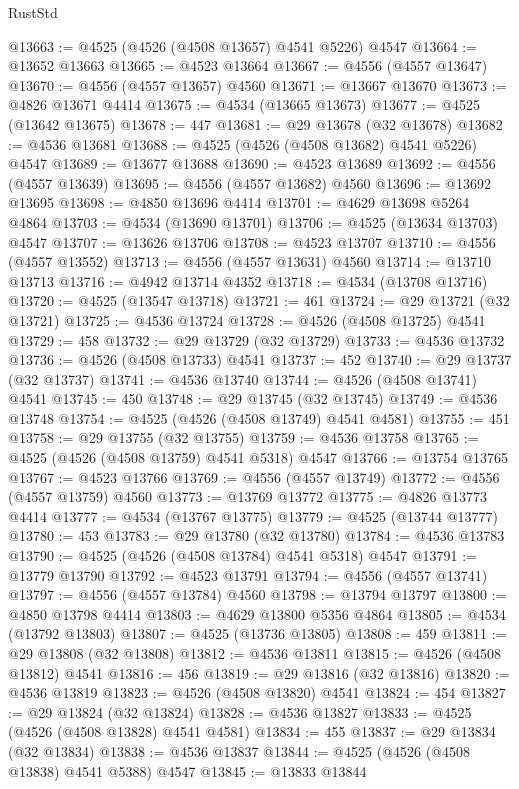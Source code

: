 \begin{lexlean}{RustStd}
\begin{coremodule}
@13663 := @4525 (@4526 (@4508 @13657) @4541 @5226) @4547
@13664 := @13652 @13663
@13665 := @4523 @13664
@13667 := @4556 (@4557 @13647)
@13670 := @4556 (@4557 @13657) @4560
@13671 := @13667 @13670
@13673 := @4826 @13671 @4414
@13675 := @4534 (@13665 @13673)
@13677 := @4525 (@13642 @13675)
@13678 := 447
@13681 := @29 @13678 (@32 @13678)
@13682 := @4536 @13681
@13688 := @4525 (@4526 (@4508 @13682) @4541 @5226) @4547
@13689 := @13677 @13688
@13690 := @4523 @13689
@13692 := @4556 (@4557 @13639)
@13695 := @4556 (@4557 @13682) @4560
@13696 := @13692 @13695
@13698 := @4850 @13696 @4414
@13701 := @4629 @13698 @5264 @4864
@13703 := @4534 (@13690 @13701)
@13706 := @4525 (@13634 @13703) @4547
@13707 := @13626 @13706
@13708 := @4523 @13707
@13710 := @4556 (@4557 @13552)
@13713 := @4556 (@4557 @13631) @4560
@13714 := @13710 @13713
@13716 := @4942 @13714 @4352
@13718 := @4534 (@13708 @13716)
@13720 := @4525 (@13547 @13718)
@13721 := 461
@13724 := @29 @13721 (@32 @13721)
@13725 := @4536 @13724
@13728 := @4526 (@4508 @13725) @4541
@13729 := 458
@13732 := @29 @13729 (@32 @13729)
@13733 := @4536 @13732
@13736 := @4526 (@4508 @13733) @4541
@13737 := 452
@13740 := @29 @13737 (@32 @13737)
@13741 := @4536 @13740
@13744 := @4526 (@4508 @13741) @4541
@13745 := 450
@13748 := @29 @13745 (@32 @13745)
@13749 := @4536 @13748
@13754 := @4525 (@4526 (@4508 @13749) @4541 @4581)
@13755 := 451
@13758 := @29 @13755 (@32 @13755)
@13759 := @4536 @13758
@13765 := @4525 (@4526 (@4508 @13759) @4541 @5318) @4547
@13766 := @13754 @13765
@13767 := @4523 @13766
@13769 := @4556 (@4557 @13749)
@13772 := @4556 (@4557 @13759) @4560
@13773 := @13769 @13772
@13775 := @4826 @13773 @4414
@13777 := @4534 (@13767 @13775)
@13779 := @4525 (@13744 @13777)
@13780 := 453
@13783 := @29 @13780 (@32 @13780)
@13784 := @4536 @13783
@13790 := @4525 (@4526 (@4508 @13784) @4541 @5318) @4547
@13791 := @13779 @13790
@13792 := @4523 @13791
@13794 := @4556 (@4557 @13741)
@13797 := @4556 (@4557 @13784) @4560
@13798 := @13794 @13797
@13800 := @4850 @13798 @4414
@13803 := @4629 @13800 @5356 @4864
@13805 := @4534 (@13792 @13803)
@13807 := @4525 (@13736 @13805)
@13808 := 459
@13811 := @29 @13808 (@32 @13808)
@13812 := @4536 @13811
@13815 := @4526 (@4508 @13812) @4541
@13816 := 456
@13819 := @29 @13816 (@32 @13816)
@13820 := @4536 @13819
@13823 := @4526 (@4508 @13820) @4541
@13824 := 454
@13827 := @29 @13824 (@32 @13824)
@13828 := @4536 @13827
@13833 := @4525 (@4526 (@4508 @13828) @4541 @4581)
@13834 := 455
@13837 := @29 @13834 (@32 @13834)
@13838 := @4536 @13837
@13844 := @4525 (@4526 (@4508 @13838) @4541 @5388) @4547
@13845 := @13833 @13844

\end{coremodule}
\end{lexlean}
